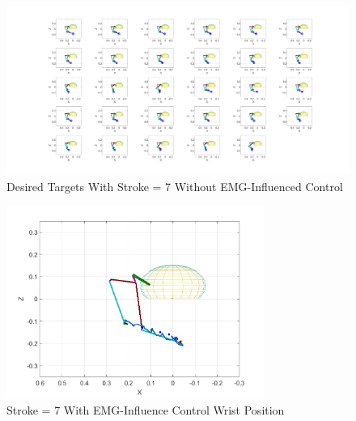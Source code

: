 \newpage
\begin{landscape} %
  \begin{figure}[h!]
    \centering
    \includegraphics[width=1.9\textwidth]{Pictures/Results/Controller/WithStroke29positions.png} %
    \caption{Desired Targets With Stroke = 7 Without EMG-Influenced Control} %
  \end{figure}
\end{landscape} %


\begin{figure}[h!]
\centering
\includegraphics[width=0.75\textwidth]{Pictures/Results/Controller/G(2.99)_G(14.48)_Stroke_7_position_totry(5485)_wp.jpg} 
\caption{Stroke = 7 With EMG-Influence Control Wrist Position} %
\label{fig:EMGWP} %
\end{figure}

